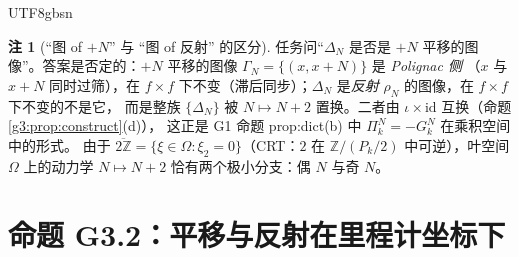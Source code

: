 \documentclass[11pt,a4paper]{article}
\newcommand{\Om}{\Omega}               %
\theoremstyle{plain}
\theoremstyle{definition}
\newtheorem{rem}[lem]{注}
\begin{document}
\begin{CJK}{UTF8}{gbsn}
\begin{rem}[“图 of $+N$” 与 “图 of 反射” 的区分]\label{g3:rem:graphs}
任务问“$\Delta_N$ 是否是 $+N$ 平移的图像”。答案是否定的：$+N$ 平移的图像 $\Gamma_N=\{(x,x+N)\}$ 是 \emph{Polignac 侧}
（$x$ 与 $x+N$ 同时过筛），在 $f\times f$ 下不变（滞后同步）；$\Delta_N$ 是\emph{反射} $\rho_N$ 的图像，在 $f\times f$ 下不变的不是它，
而是整族 $\{\Delta_N\}$ 被 $N\mapsto N+2$ 置换。二者由 $\iota\times\mathrm{id}$ 互换（命题 \ref{g3:prop:construct}(d)），
这正是 G1 命题 prop:dict(b) 中 $\Pi_k^N=-G_k^N$ 在乘积空间中的形式。
由于 $\overline{2\mathbb Z}=\{\xi\in\Om:\xi_2=0\}$（CRT：$2$ 在 $\mathbb Z/(P_k/2)$ 中可逆），叶空间 $\Om$ 上的动力学 $N\mapsto N+2$ 恰有两个极小分支：偶 $N$ 与奇 $N$。
\end{rem}

\section{命题 G3.2：平移与反射在里程计坐标下}\label{g3:sec:reflect}


\end{CJK}
\end{document}
